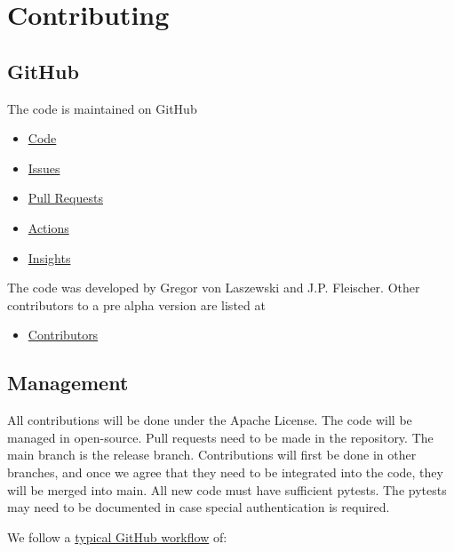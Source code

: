 \section{Contributing}\label{contributing}

\subsection{GitHub}\label{github}

The code is maintained on GitHub

\begin{itemize}
\item
  \href{https://github.com/cloudmesh/cloudmesh-cc}{Code}
\item
  \href{https://github.com/cloudmesh/cloudmesh-cc/issues}{Issues}
\item
  \href{https://github.com/cloudmesh/cloudmesh-cc/pulls}{Pull Requests}
\item
  \href{https://github.com/cloudmesh/cloudmesh-cc/actions}{Actions}
\item
  \href{https://github.com/cloudmesh/cloudmesh-cc/pulse}{Insights}
\end{itemize}

The code was developed by Gregor von Laszewski and J.P. Fleischer. Other
contributors to a pre alpha version are listed at

\begin{itemize}
\item
  \href{https://github.com/cloudmesh/cloudmesh-cc/graphs/contributors}{Contributors}
\end{itemize}

\subsection{Management}\label{management}

All contributions will be done under the Apache License. The code will
be managed in open-source. Pull requests need to be made in the
repository. The main branch is the release branch. Contributions will
first be done in other branches, and once we agree that they need to be
integrated into the code, they will be merged into main. All new code
must have sufficient pytests. The pytests may need to be documented in
case special authentication is required.

We follow a
\href{https://docs.github.com/en/get-started/quickstart/github-flow}{typical
GitHub workflow} of:

